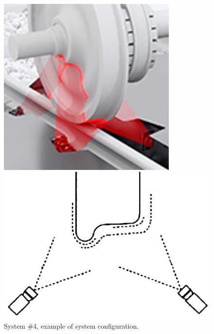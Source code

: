  \begin{figure}[t!]
    \centering
    \begin{minipage}[c]{.49\textwidth}
      \centering
      \includegraphics[width=0.8\textwidth]{./images/wpms/test2_cut.jpg}
    \end{minipage}%
    \hfill
    \begin{minipage}[c]{.49\textwidth}
      \centering
      \includegraphics[width=\textwidth]{./images/wpms/laser_pts.png}
    \end{minipage}
    
    \caption{System \#4, example of system configuration.}
    \label{fig:cmp-sys4}
  \end{figure}

